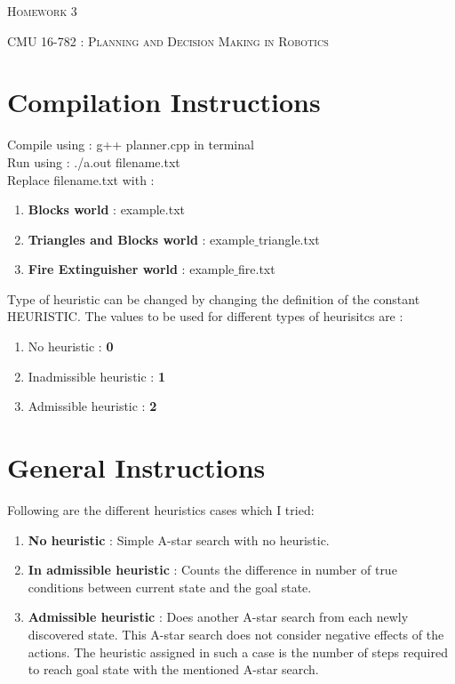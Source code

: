 \documentclass[12pt]{article}
\begin{document}
\begin{center}
  \centerline{\textsc{\LARGE  Homework 3}}
  \vspace{1em}
  \textsc{\large CMU 16-782 : Planning and Decision Making in Robotics} \\
\end{center}

\section{Compilation Instructions}
Compile using : g++ planner.cpp in terminal \\
Run using : ./a.out filename.txt \\
Replace filename.txt with : 
\begin{enumerate}
    \item \textbf{Blocks world} : example.txt
    \item \textbf{Triangles and Blocks world} : example$\_$triangle.txt
    \item \textbf{Fire Extinguisher world} : example$\_$fire.txt
\end{enumerate}
Type of heuristic can be changed by changing the definition of the constant HEURISTIC. The values to be used for different types of heurisitcs are :
\begin{enumerate}
    \item No heuristic : \textbf{0}
    \item Inadmissible heuristic : \textbf{1}
    \item Admissible heuristic : \textbf{2}
\end{enumerate}

\section{General Instructions}
Following are the different heuristics cases which I tried:
\begin{enumerate}
    \item \textbf{No heuristic} : Simple A-star search with no heuristic.
    \item \textbf{In admissible heuristic} : Counts the difference in number of true conditions between current state and the goal state.
    \item \textbf{Admissible heuristic} : Does another A-star search from each newly discovered state. This A-star search does not consider negative effects of the actions. The heuristic assigned in such a case is the number of steps required to reach goal state with the mentioned A-star search.
\end{enumerate}
 
\end{document}
